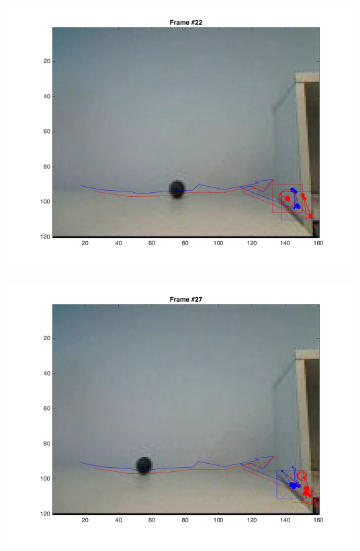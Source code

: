 \documentclass{ethz_report}
\begin{document}
\begin{figure}[h]
\begin{subfigure}[b]{.25\textwidth}
        \includegraphics[width=1\linewidth]{images/video3_noise_high_21}
    \end{subfigure}%
    \begin{subfigure}[b]{.25\textwidth}
        \centering
        \includegraphics[width=1\linewidth]{images/video3_noise_high_26}
    \end{subfigure}%
    \begin{subfigure}[b]{.25\textwidth}
        \centering

\end{subfigure}
\end{figure}
\end{document}
